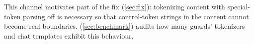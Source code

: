 This channel motivates part of the fix (\cref{sec:fix}): tokenizing content with special-token parsing off is necessary so that control-token strings in the content cannot become real boundaries.
\guardrebind{} (\cref{sec:benchmark}) audits how many guards' tokenizers and chat templates exhibit this behaviour.
